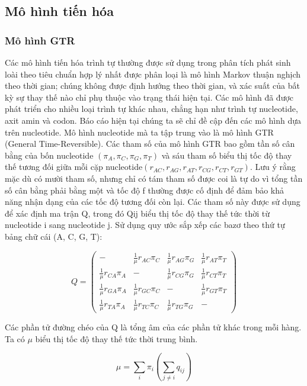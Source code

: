 \documentclass[12pt,a4paper]{report}
\begin{document}
\subsection{Mô hình tiến hóa}

\subsubsection{Mô hình GTR}
Các mô hình tiến hóa trình tự thường được sử dụng trong phân tích phát sinh loài theo tiêu chuẩn hợp lý nhất được phân loại là mô hình Markov thuận nghịch theo thời gian; chúng không được định hướng theo thời gian, và xác suất của bất kỳ sự thay thế nào chỉ phụ thuộc vào trạng thái hiện tại. Các mô hình đã được phát triển cho nhiều loại trình tự khác nhau, chẳng hạn như trình tự nucleotide, axit amin và codon. Báo cáo hiện tại chúng ta sẽ chỉ đề cập đến các mô hình dựa trên nucleotide. Mô hình nucleotide mà ta tập trung vào là mô hình GTR (General Time-Reversible). Các tham số của mô hình GTR
bao gồm tần số cân bằng của bốn nucleotide \((\pi_A, \pi_C, \pi_G, \pi_T)\) và sáu tham số biểu thị tốc độ thay thế tương đối giữa mỗi cặp nucleotide\((r_{AC}, r_{AG}, r_{AT}, r_{CG}, r_{CT}, r_{GT})\). Lưu ý rằng mặc dù có mười tham số, nhưng chỉ có tám tham số được coi là tự do vì tổng tần số cân bằng phải bằng một và tốc độ f thường được cố định để đảm bảo khả năng nhận dạng của các tốc độ tương đối còn lại. Các tham số này được sử dụng để xác định ma trận Q, trong đó Qij biểu thị tốc độ thay thế tức thời từ nucleotide i sang nucleotide j. Sử dụng quy ước sắp xếp các bazơ theo thứ tự bảng chữ cái (A, C, G, T):

\[
Q =
\begin{pmatrix}
- & \frac{1}{\mu} r_{AC} \pi_C & \frac{1}{\mu} r_{AG} \pi_G & \frac{1}{\mu} r_{AT} \pi_T \\
\frac{1}{\mu} r_{CA} \pi_A & - & \frac{1}{\mu} r_{CG} \pi_G
& \frac{1}{\mu} r_{CT} \pi_T \\
\frac{1}{\mu} r_{GA} \pi_A & \frac{1}{\mu} r_{GC} \pi_C & - & \frac{1}{\mu} r_{GT} \pi_T \\
\frac{1}{\mu} r_{TA} \pi_A & \frac{1}{\mu} r_{TC} \pi_C & \frac{1}{\mu} r_{TG} \pi_G & -
\end{pmatrix}
\]



Các phần tử đường chéo của Q là tổng âm của các phần tử khác trong mỗi hàng. Ta có \(\mu\) biểu thị tốc độ thay thế tức thời trung bình. 
    
\begin{equation}
    \mu = \sum_{i} \pi_i \left( \sum_{j \neq i} q_{ij} \right)
    \label{eq:placeholder_label}
\end{equation}
\end{document}
